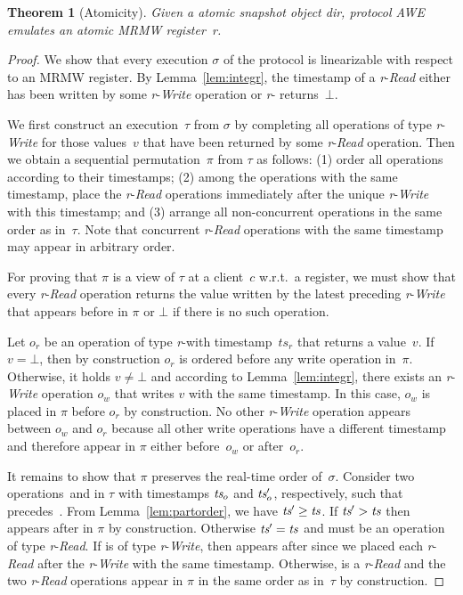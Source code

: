 \documentclass[oribibl]{llncs}
\newtheorem{theorem}{Theorem}
\theoremstyle{definition-boldhead}
\newcommand{\var}[1]{\textit{#1}}
\newcommand{\op}[1]{\textsl{#1}}
\newcommand{\dir}{\var{dir}\xspace}
\newcommand{\NAME}{AWE\xspace}
\begin{document}
\if\submit\no
\begin{theorem}[Atomicity]\label{thm:atomic}
  Given a atomic snapshot object \dir, protocol \NAME emulates an
  atomic MRMW register~\var{r}.
\end{theorem}


\begin{proof}
  We show that every execution $\sigma$ of the protocol is
  linearizable with respect to an MRMW register.  By
  Lemma~\ref{lem:integr}, the timestamp of a \var{r}-\op{Read} either
  has been written by some \var{r}-\op{Write} operation or \var{r}-\opread
  returns~$\bot$.

  We first construct an execution~$\tau$ from $\sigma$ by completing
  all operations of type \var{r}-\op{Write} for those values~$v$ that
  have been returned by some \var{r}-\op{Read} operation. Then we
  obtain a sequential permutation~$\pi$ from $\tau$ as follows: (1)
  order all operations according to their timestamps; (2) among the
  operations with the same timestamp, place the \var{r}-\op{Read}
  operations immediately after the unique \var{r}-\op{Write} with this
  timestamp; and (3) arrange all non-concurrent operations in the same
  order as in~$\tau$.  Note that concurrent \var{r}-\op{Read}
  operations with the same timestamp may appear in arbitrary order.

  For proving that $\pi$ is a view of $\tau$ at a client~$c$ w.r.t.\ a
  register, we must show that every \var{r}-\op{Read} operation
  returns the value written by the latest preceding \var{r}-\op{Write}
  that appears before in $\pi$ or $\bot$ if there is no such
  operation.

  Let $o_r$ be an operation of type \var{r}-\opread with
  timestamp~$\var{ts}_r$ that returns a value~$v$. If $v = \bot$, then
  by construction $o_r$ is ordered before any write operation
  in~$\pi$.  Otherwise, it holds $v \neq \bot$ and according to
  Lemma~\ref{lem:integr}, there exists an \var{r}-\op{Write} operation
  $o_w$ that writes $v$ with the same timestamp.  In this case, $o_w$
  is placed in $\pi$ before $o_r$ by construction.  No other
  \var{r}-\op{Write} operation appears between $o_w$ and $o_r$ because
  all other write operations have a different timestamp and therefore
  appear in $\pi$ either before~$o_w$ or after~$o_r$.

  It remains to show that $\pi$ preserves the real-time order
  of~$\sigma$.  Consider two operations~\opr and \popr in $\tau$ with
  timestamps $\var{ts}_\opr$ and $\var{ts}_\popr$, respectively, such
  that \opr precedes~\popr.  From Lemma~\ref{lem:partorder}, we have
  $\tspopr \geq \tsopr$. If $\tspopr > \tsopr$ then \popr appears
  after \opr in $\pi$ by construction.  Otherwise $\tspopr = \tsopr$
  and \popr must be an operation of type \var{r}-\op{Read}.  If \opr
  is of type \var{r}-\op{Write}, then \popr appears after \opr since
  we placed each \var{r}-\op{Read} after the \var{r}-\op{Write} with
  the same timestamp.  Otherwise, \opr is a \var{r}-\op{Read} and the
  two \var{r}-\op{Read} operations appear in $\pi$ in the same order
  as in~$\tau$ by construction.
\end{proof}
\fi
\end{document}
